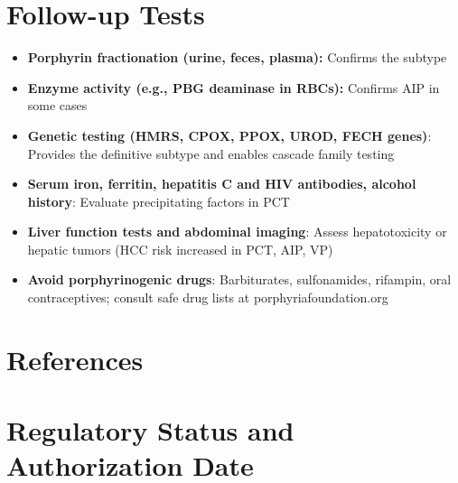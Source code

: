 \section*{Follow-up Tests}
\begin{itemize}
  \item \textbf{Porphyrin fractionation (urine, feces, plasma):} Confirms the subtype
  \item \textbf{Enzyme activity (e.g., PBG deaminase in RBCs):} Confirms AIP in some cases
  \item \textbf{Genetic testing (HMRS, CPOX, PPOX, UROD, FECH genes)}: Provides the definitive subtype and enables cascade family testing
  \item \textbf{Serum iron, ferritin, hepatitis C and HIV antibodies, alcohol history}: Evaluate precipitating factors in PCT
  \item \textbf{Liver function tests and abdominal imaging}: Assess hepatotoxicity or hepatic tumors (HCC risk increased in PCT, AIP, VP)
  \item \textbf{Avoid porphyrinogenic drugs}: Barbiturates, sulfonamides, rifampin, oral contraceptives; consult safe drug lists at porphyriafoundation.org \cite{americanporphyria}
\end{itemize}

\section*{References}



\clearpage
\section*{Regulatory Status and Authorization Date}

\clearpage
